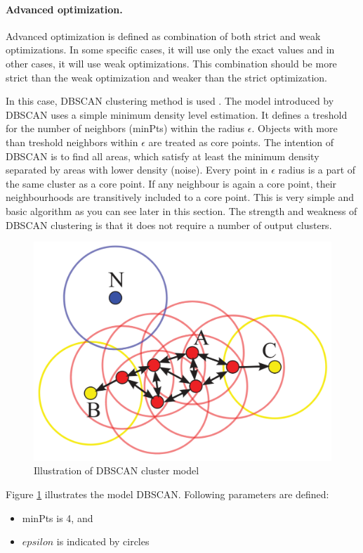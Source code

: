 	\paragraph{Advanced optimization.}
	Advanced optimization is defined as combination of both strict and weak
	optimizations. In some specific cases, it will use only the exact values and in
	other cases, it will use weak optimizations. This combination should be more
	strict than the weak optimization and weaker than the strict optimization.

	In this case, DBSCAN clustering method is used
	\cite{Schubert:2017:DRR:3129336.3068335}. The model introduced by DBSCAN uses
	a simple minimum density level estimation. It defines a treshold for the
	number of neighbors (minPts) within the radius $\epsilon$. Objects with more
	than treshold neighbors within $\epsilon$ are treated as core points. The
	intention of DBSCAN is to find all areas, which satisfy at least the minimum
	density separated by areas with lower density (noise). Every point in
	$\epsilon$ radius is a part of the same cluster as a core point. If any
	neighbour is again a core point, their neighbourhoods are transitively
	included to a core point. This is very simple and basic algorithm as you can
	see later in this section. The strength and weakness of DBSCAN clustering is
	that it does not require a number of output clusters.

	\begin{figure}[h]
		\centering
		\includegraphics[width=0.5\linewidth]{obrazky-figures/dbscan}
		\caption{Illustration of DBSCAN cluster model}
		\label{dbscan_ilustration}
	\end{figure}

	Figure \ref{dbscan_ilustration} illustrates the model DBSCAN.
	Following parameters are defined:
	\begin{itemize}
			\item minPts is 4, and
			\item $epsilon$ is indicated by circles
	\end{itemize}

